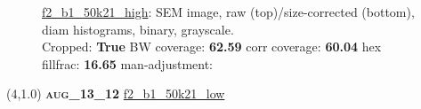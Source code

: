 \begin{figure}[h!]
\label{semimg25}
\caption*{\hyperlink{covtableaug_13_12}{\color{blue} \small \ttfamily f2\_b1\_50k21\_high}: SEM image, raw (top)/size-corrected (bottom), diam histograms, binary, grayscale.\\Cropped: {\bf True} \;\; BW coverage: {\bf 62.59} \:\: corr coverage: {\bf 60.04} \:\: hex fillfrac: {\bf 16.65} \:\: man-adjustment: {\bf \color{blue}{Yes}}}
\end{figure}
\newpage

\begin{textblock}{5}(4,1.0)
{\bf \textsc{aug\_13\_12}}
\hspace{4.5cm}
\hyperlink{covtableaug_13_12}{\color{blue} \large \ttfamily f2\_b1\_50k21\_low}
\end{textblock}


